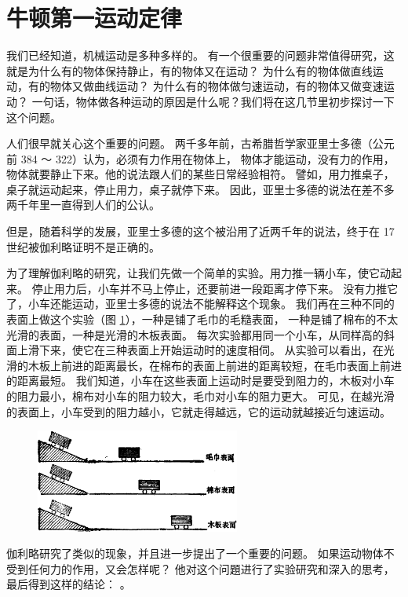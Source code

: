 \section{牛顿第一运动定律}\label{sec:3-6}

我们已经知道，机械运动是多种多样的。
有一个很重要的问题非常值得研究，这就是为什么有的物体保持静止，有的物体又在运动？
为什么有的物体做直线运动，有的物体又做曲线运动？
为什么有的物体做匀速运动，有的物体又做变速运动？
一句话，物体做各种运动的原因是什么呢？我们将在这几节里初步探讨一下这个问题。

人们很早就关心这个重要的问题。
两千多年前，古希腊哲学家亚里士多德（公元前 384 ～ 322）认为，必须有力作用在物体上，
物体才能运动，没有力的作用，物体就要静止下来。他的说法跟人们的某些日常经验相符。
譬如，用力推桌子，桌子就运动起来，停止用力，桌子就停下来。
因此，亚里士多德的说法在差不多两千年里一直得到人们的公认。

但是，随着科学的发展，亚里士多德的这个被沿用了近两千年的说法，终于在 17 世纪被伽利略证明不是正确的。

为了理解伽利略的研究，让我们先做一个简单的实验。用力推一辆小车，使它动起来。
停止用力后，小车并不马上停止，还要前进一段距离才停下来。
没有力推它了，小车还能运动，亚里士多德的说法不能解释这个现象。
我们再在三种不同的表面上做这个实验（图 \ref{fig:3-5}），一种是铺了毛巾的毛糙表面，
一种是铺了棉布的不太光滑的表面，一种是光滑的木板表面。
每次实验都用同一个小车，从同样高的斜面上滑下来，使它在三种表面上开始运动时的速度相伺。
从实验可以看出，在光滑的木板上前进的距离最长，在棉布的表面上前进的距离较短，在毛巾表面上前进的距离最短。
我们知道，小车在这些表面上运动时是要受到阻力的，木板对小车的阻力最小，棉布对小车的阻力较大，毛巾对小车的阻力更大。
可见，在越光滑的表面上，小车受到的阻力越小，它就走得越远，它的运动就越接近匀速运动。

\begin{figure}[htbp]
    \centering
    \includegraphics[width=0.6\textwidth]{../pic/czwl1-ch3-5}
    \caption{}\label{fig:3-5}
\end{figure}

伽利略研究了类似的现象，并且进一步提出了一个重要的问题。
如果运动物体不受到任何力的作用，又会怎样呢？
他对这个问題进行了实验研究和深入的思考，最后得到这样的结论：
。

